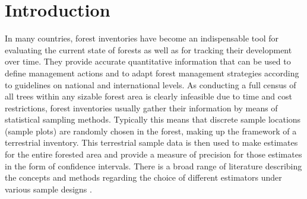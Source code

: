 
\section{Introduction}
\label{sec:intro}


In many countries, forest inventories have become an indispensable tool for evaluating the current state of forests as well as for tracking their development over time. They provide accurate quantitative information that can be used to define management actions and to adapt forest management strategies according to guidelines on national and international levels. As conducting a full census of all trees within any sizable forest area is clearly infeasible due to time and cost restrictions, forest inventories usually gather their information by means of statistical sampling methods. Typically this means that discrete sample locations (sample plots) are randomly chosen in the forest, making up the framework of a terrestrial inventory.  This terrestrial sample data is then used to make estimates for the entire forested area and provide a measure of precision for those estimates in the form of confidence intervals. There is a broad range of literature describing the concepts and methods regarding the choice of different estimators under various sample designs \citep{gregoire2007, kohl2006, schreuder1993, mandallaz2008}.


